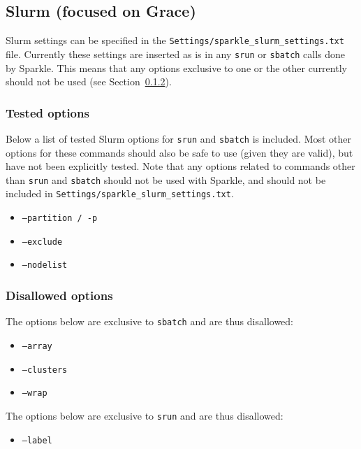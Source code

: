 \documentclass{article}
\begin{document}
\subsection{Slurm (focused on Grace)}
Slurm settings can be specified in the \texttt{Settings/sparkle\_slurm\_settings.txt} file. Currently these settings are inserted as is in any \texttt{srun} or \texttt{sbatch} calls done by Sparkle. This means that any options exclusive to one or the other currently should not be used (see Section~\ref{slurm:disallowed}).

\subsubsection{Tested options}
Below a list of tested Slurm options for \texttt{srun} and \texttt{sbatch} is included. Most other options for these commands should also be safe to use (given they are valid), but have not been explicitly tested. Note that any options related to commands other than \texttt{srun} and \texttt{sbatch} should not be used with Sparkle, and should not be included in \texttt{Settings/sparkle\_slurm\_settings.txt}.

\begin{itemize}[noitemsep]
  \item[] \texttt{--partition / -p}
  \item[] \texttt{--exclude}
  \item[] \texttt{--nodelist}
\end{itemize}

\subsubsection{Disallowed options}
\label{slurm:disallowed}
The options below are exclusive to \texttt{sbatch} and are thus disallowed:

\begin{itemize}[noitemsep]
  \item[] \texttt{--array}
  \item[] \texttt{--clusters}
  \item[] \texttt{--wrap}
\end{itemize}

The options below are exclusive to \texttt{srun} and are thus disallowed:

\begin{itemize}[noitemsep]
  \item[] \texttt{--label}
\end{itemize}
\end{document}

